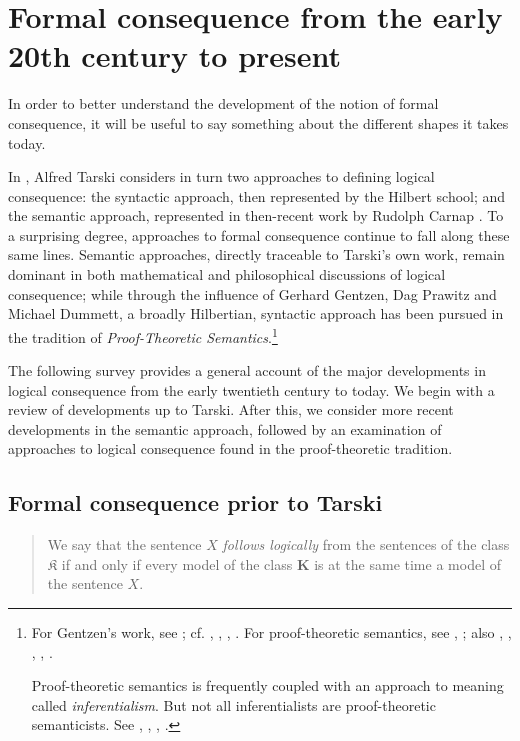 	\section[Formal consequence from the 20th century]{Formal consequence from the early 20th century to present}
	In order to better understand the development of the notion of formal consequence, it will be useful to say something about the different shapes it takes today. 
		
	In \cite{Tarski2002}, Alfred Tarski considers in turn two approaches to defining logical consequence: the syntactic approach, then represented by the Hilbert school; and the semantic approach, represented in then-recent work by Rudolph Carnap \cite{Carnap1934}. To a surprising degree, approaches to formal consequence continue to fall along these same lines. Semantic approaches, directly traceable to Tarski's own work, remain dominant in both mathematical and philosophical discussions of logical consequence; while through the influence of Gerhard Gentzen, Dag Prawitz and Michael Dummett, a broadly Hilbertian, syntactic approach has been pursued in the tradition of \textit{Proof-Theoretic Semantics}.\footnote{For Gentzen's work, see \cite{Gentzen1934}; cf. \cite{Franks2010}, \cite{Hazen2014}, \cite{Moriconi2015}, \cite{vonPlato2014}. For proof-theoretic semantics, see \cite{Prawitz1974}, \cite{Prawitz1985}; also \cite{Jacinto2017}, \cite{Francez2014a}, \cite{Francez2016a}, \cite{Francez2016b}, \cite{Schroeder-Heister2006}.
		
		Proof-theoretic semantics is frequently coupled with an approach to meaning called \textit{inferentialism}. But not all inferentialists are proof-theoretic semanticists. See \cite{Belnap1990}, \cite{Garson2001}, \cite{Garson2013}, \cite{Hjortland2009}.}
	
	The following survey provides a general account of the major developments in logical consequence from the early twentieth century to today. We begin with a review of developments up to Tarski. After this, we consider more recent developments in the semantic approach, followed by an examination of approaches to logical consequence found in the proof-theoretic tradition.
	\subsection{Formal consequence prior to Tarski}
	\begin{quote}
		{We say that the sentence $X$ \textit{follows logically} from the sentences of the class $\mathfrak{K}$ if and only if every model of the class $\textbf{K}$ is at the same time a model of the sentence $X$.} \cite[186]{Tarski2002}
	\end{quote}
	
